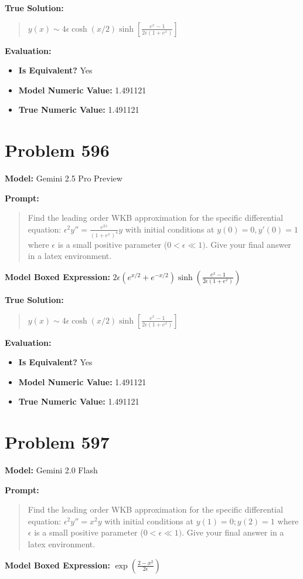 \documentclass{article}
\begin{document}
\textbf{True Solution:}
\begin{quote}
$y(x) \sim 4\epsilon \cosh(x/2)\sinh\left[\frac{e^x-1}{2\epsilon(1+e^x)}\right]$
\end{quote}

\textbf{Evaluation:}
\begin{itemize}
\item \textbf{Is Equivalent?} Yes
\item \textbf{Model Numeric Value:} 1.491121
\item \textbf{True Numeric Value:} 1.491121
\end{itemize}
\vspace{1cm}
\section*{Problem 596}
\textbf{Model:} Gemini 2.5 Pro Preview

\textbf{Prompt:}
\begin{quote}
Find the leading order WKB approximation for the specific differential equation: $\epsilon^2 y'' = \frac{e^{2x}}{(1+e^x)^4} y$ with initial conditions at $y(0)=0, y'(0)=1$ where $\epsilon$ is a small positive parameter ($0 < \epsilon \ll 1)$. Give your final answer in a \boxed latex environment.
\end{quote}
\textbf{Model Boxed Expression:} $2\epsilon (e^{x/2}+e^{-x/2}) \sinh\left(\frac{e^x-1}{2\epsilon(1+e^x)}\right)$

\textbf{True Solution:}
\begin{quote}
$y(x) \sim 4\epsilon \cosh(x/2)\sinh\left[\frac{e^x-1}{2\epsilon(1+e^x)}\right]$
\end{quote}

\textbf{Evaluation:}
\begin{itemize}
\item \textbf{Is Equivalent?} Yes
\item \textbf{Model Numeric Value:} 1.491121
\item \textbf{True Numeric Value:} 1.491121
\end{itemize}
\vspace{1cm}
\section*{Problem 597}
\textbf{Model:} Gemini 2.0 Flash

\textbf{Prompt:}
\begin{quote}
Find the leading order WKB approximation for the specific differential equation: $\epsilon^2y''=x^2y$ with initial conditions at $y(1)=0; y(2)=1$ where $\epsilon$ is a small positive parameter ($0 < \epsilon \ll 1)$. Give your final answer in a \boxed latex environment.
\end{quote}
\textbf{Model Boxed Expression:} $\exp\left(\frac{2-x^2}{2\epsilon}\right)$
\end{document}
